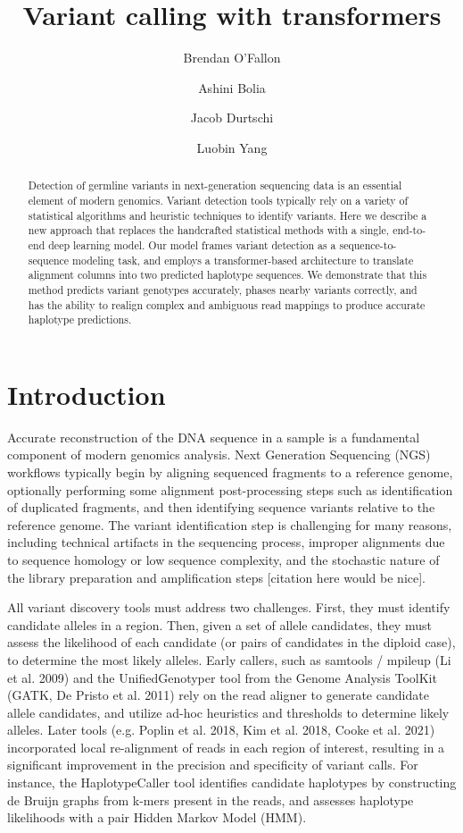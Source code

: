\documentclass[]{article}
\title{Variant calling with transformers}
\author[1]{Brendan O'Fallon}
\author[1]{Ashini Bolia}
\author[1]{Jacob Durtschi}
\author[1]{Luobin Yang}
\affil[1]{ARUP Institute for Clinical and Experimental Pathology, Salt Lake City, UT}
\date{}
\begin{document}
\maketitle

\begin{abstract}
	Detection of germline variants in next-generation sequencing data is an essential element of modern genomics. Variant detection tools typically rely on a variety of statistical algorithms and heuristic techniques to identify variants. Here we describe a new approach that replaces the handcrafted statistical methods with a single, end-to-end deep learning model. Our model frames variant detection as a sequence-to-sequence modeling task, and employs a transformer-based architecture to translate alignment columns into two predicted haplotype sequences. We demonstrate that this method predicts variant genotypes accurately, phases nearby variants correctly, and has the ability to realign complex and ambiguous read mappings to produce accurate haplotype predictions. 

\end{abstract}



\section{Introduction}

Accurate reconstruction of the DNA sequence in a sample is a fundamental component of modern genomics analysis. Next Generation Sequencing (NGS) workflows typically begin by aligning sequenced fragments to a reference genome, optionally performing some alignment post-processing steps such as identification of duplicated fragments, and then identifying sequence variants relative to the reference genome. The variant identification step is challenging for many reasons, including technical artifacts in the sequencing process, improper alignments due to sequence homology or low sequence complexity, and the stochastic nature of the library preparation and amplification steps [citation here would be nice]. 

All variant discovery tools must address two challenges. First, they must identify candidate alleles in a region. Then, given a set of allele candidates, they must assess the likelihood of each candidate (or pairs of candidates in the diploid case), to determine the most likely alleles. Early callers, such as samtools / mpileup (Li et al. 2009) and the UnifiedGenotyper tool from the Genome Analysis ToolKit (GATK, De Pristo et al. 2011) rely on the read aligner to generate candidate allele candidates, and utilize ad-hoc heuristics and thresholds to determine likely alleles. Later tools (e.g. Poplin et al. 2018, Kim et al. 2018, Cooke et al. 2021) incorporated local re-alignment of reads in each region of interest, resulting in a significant improvement in the precision and specificity of variant calls. For instance, the HaplotypeCaller tool identifies candidate haplotypes by constructing de Bruijn graphs from k-mers present in the reads, and assesses haplotype likelihoods with a pair Hidden Markov Model (HMM). 
\end{document}

